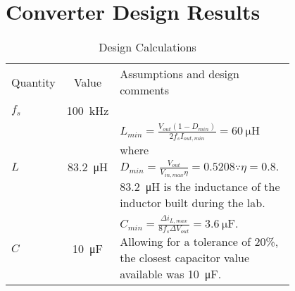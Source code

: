\section{Converter Design Results}
\begin{table}[h]
	\centering
	\caption{Design Calculations}
	\begin{tabular}{lcp{0.8\linewidth}}
		\toprule
		Quantity&Value&Assumptions and design comments\\
		\cmidrule(r){1-1}\cmidrule(lr){2-2}\cmidrule(l){3-3}
		$f_s$ & \SI{100}{\kilo\hertz} & \\
		$L$ & \SI{83.2}{\micro\henry} & $L_{min} = \frac{V_{out}(1-D_{min})}{2 f_s I_{out,min}} = \SI{60}{\micro\henry}$ where $D_{min}=\frac{V_{out}}{V_{in,max}\eta} = 0.5208 \because \eta=0.8$.  \SI{83.2}{\micro\henry} is the inductance of the inductor built during the lab.\\
		$C$ & \SI{10}{\micro\farad} & $C_{min}=\frac{\Delta i_{L,max}}{8 f_s \Delta V_{out}}=\SI{3.6}{\micro\farad}$. Allowing for a tolerance of 20\%, the closest capacitor value available was  \SI{10}{\micro\farad}.\\
		\bottomrule
	\end{tabular}
	\label{tab:converter:design calculations}
\end{table}

